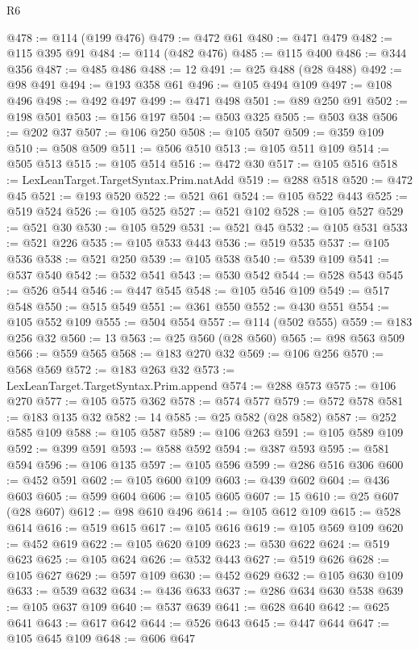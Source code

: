 \begin{lexlean}{R6}
\begin{coremodule}
{{{{{{{{{{{{{{{{{{{{{{{{{{{{{{{{{{{{{{{{{{{{{{{{{{{{{{{{{{{{{@478 := @114 (@199 @476)
@479 := @472 @61
@480 := @471 @479
@482 := @115 @395 @91
@484 := @114 (@482 @476)
@485 := @115 @400
@486 := @344 @356
@487 := @485 @486
@488 := 12
@491 := @25 @488 (@28 @488)
@492 := @98 @491
@494 := @193 @358 @61
@496 := @105 @494 @109
@497 := @108 @496
@498 := @492 @497
@499 := @471 @498
@501 := @89 @250 @91
@502 := @198 @501
@503 := @156 @197
@504 := @503 @325
@505 := @503 @38
@506 := @202 @37
@507 := @106 @250
@508 := @105 @507
@509 := @359 @109
@510 := @508 @509
@511 := @506 @510
@513 := @105 @511 @109
@514 := @505 @513
@515 := @105 @514
@516 := @472 @30
@517 := @105 @516
@518 := LexLeanTarget.TargetSyntax.Prim.natAdd
@519 := @288 @518
@520 := @472 @45
@521 := @193 @520
@522 := @521 @61
@524 := @105 @522 @443
@525 := @519 @524
@526 := @105 @525
@527 := @521 @102
@528 := @105 @527
@529 := @521 @30
@530 := @105 @529
@531 := @521 @45
@532 := @105 @531
@533 := @521 @226
@535 := @105 @533 @443
@536 := @519 @535
@537 := @105 @536
@538 := @521 @250
@539 := @105 @538
@540 := @539 @109
@541 := @537 @540
@542 := @532 @541
@543 := @530 @542
@544 := @528 @543
@545 := @526 @544
@546 := @447 @545
@548 := @105 @546 @109
@549 := @517 @548
@550 := @515 @549
@551 := @361 @550
@552 := @430 @551
@554 := @105 @552 @109
@555 := @504 @554
@557 := @114 (@502 @555)
@559 := @183 @256 @32
@560 := 13
@563 := @25 @560 (@28 @560)
@565 := @98 @563 @509
@566 := @559 @565
@568 := @183 @270 @32
@569 := @106 @256
@570 := @568 @569
@572 := @183 @263 @32
@573 := LexLeanTarget.TargetSyntax.Prim.append
@574 := @288 @573
@575 := @106 @270
@577 := @105 @575 @362
@578 := @574 @577
@579 := @572 @578
@581 := @183 @135 @32
@582 := 14
@585 := @25 @582 (@28 @582)
@587 := @252 @585 @109
@588 := @105 @587
@589 := @106 @263
@591 := @105 @589 @109
@592 := @399 @591
@593 := @588 @592
@594 := @387 @593
@595 := @581 @594
@596 := @106 @135
@597 := @105 @596
@599 := @286 @516 @306
@600 := @452 @591
@602 := @105 @600 @109
@603 := @439 @602
@604 := @436 @603
@605 := @599 @604
@606 := @105 @605
@607 := 15
@610 := @25 @607 (@28 @607)
@612 := @98 @610 @496
@614 := @105 @612 @109
@615 := @528 @614
@616 := @519 @615
@617 := @105 @616
@619 := @105 @569 @109
@620 := @452 @619
@622 := @105 @620 @109
@623 := @530 @622
@624 := @519 @623
@625 := @105 @624
@626 := @532 @443
@627 := @519 @626
@628 := @105 @627
@629 := @597 @109
@630 := @452 @629
@632 := @105 @630 @109
@633 := @539 @632
@634 := @436 @633
@637 := @286 @634 @630 @538
@639 := @105 @637 @109
@640 := @537 @639
@641 := @628 @640
@642 := @625 @641
@643 := @617 @642
@644 := @526 @643
@645 := @447 @644
@647 := @105 @645 @109
@648 := @606 @647
}}}}}}}}}}}}}}}}}}}}}}}}}}}}}}}}}}}}}}}}}}}}}}}}}}}}}}}}}}}}}
\end{coremodule}
\end{lexlean}
